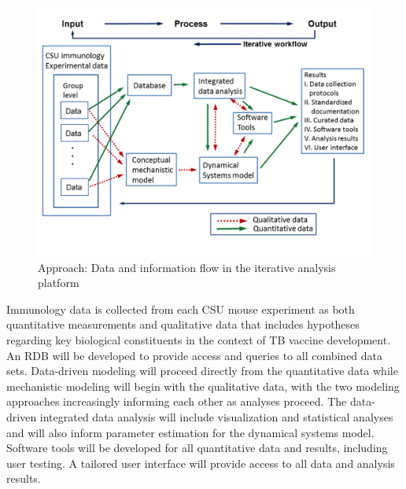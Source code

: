 \documentclass[]{book}
\begin{document}
\begin{figure}

{\centering \includegraphics[width=0.7\linewidth]{figures/Fig2_Approach} 

}

\caption{Approach: Data and information flow in the iterative analysis platform}\label{fig:approach}
\end{figure}

Immunology data is collected from each CSU mouse experiment as both
quantitative measurements and qualitative data that includes hypotheses
regarding key biological constituents in the context of TB vaccine
development. An RDB will be developed to provide access and queries to
all combined data sets. Data-driven modeling will proceed directly from
the quantitative data while mechanistic modeling will begin with the
qualitative data, with the two modeling approaches increasingly
informing each other as analyses proceed. The data-driven integrated
data analysis will include visualization and statistical analyses and
will also inform parameter estimation for the dynamical systems model.
Software tools will be developed for all quantitative data and results,
including user testing. A tailored user interface will provide access to
all data and analysis results.
\end{document}
